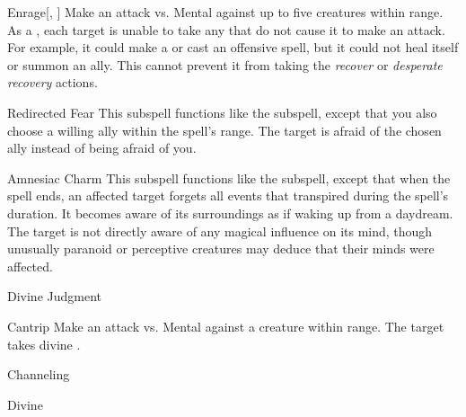 \begin{ability}[\nth{2}]{Enrage}[, ]
Make an attack vs. Mental against up to five creatures within \rngmed range.
\hit As a , each target is unable to take any  that do not cause it to make an attack.
For example, it could make a  or cast an offensive spell, but it could not heal itself or summon an ally.
This cannot prevent it from taking the \textit{recover} or \textit{desperate recovery} actions.
\end{ability}
\vspace{0.25em}



\begin{ability}[\nth{2}]{Redirected Fear}
This subspell functions like the  subspell, except that you also choose a willing ally within the spell's range.
The target is afraid of the chosen ally instead of being afraid of you.
\end{ability}
\vspace{0.25em}



\begin{ability}[\nth{5}]{Amnesiac Charm}
This subspell functions like the  subspell, except that when the spell ends, an affected target forgets all events that transpired during the spell's duration.
It becomes aware of its surroundings as if waking up from a daydream.
The target is not directly aware of any magical influence on its mind, though unusually paranoid or perceptive creatures may deduce that their minds were affected.
\end{ability}
\vspace{0.25em}


\newpage
\begin{spellsection}{Divine Judgment}

\begin{spellheader}
\end{spellheader}


\begin{ability}{Cantrip}
Make an attack vs. Mental against a creature within \rngmed range.
\hit The target takes divine .
\end{ability}




 Channeling

 Divine
\end{spellsection}


